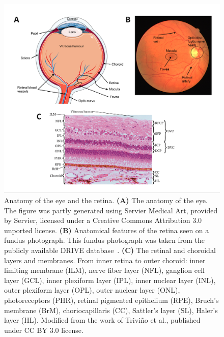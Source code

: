 \documentclass{article}
\begin{document}
\begin{figure}[t!]
  \centering
  \includegraphics[width=\textwidth]{Figure1}
  \caption{Anatomy of the eye and the retina. \textbf{(A)} The anatomy of the eye. The figure was partly generated using Servier Medical Art, provided by Servier, licensed under a Creative Commons Attribution 3.0 unported license. \textbf{(B)} Anatomical features of the retina seen on a fundus photograph. This fundus photograph was taken from the publicly available DRIVE database~\cite{Staal_2004}. \textbf{(C)} The retinal and choroidal layers and membranes. From inner retina to outer choroid: inner limiting membrane (ILM), nerve fiber layer (NFL), ganglion cell layer (GCL), inner plexiform layer (IPL), inner nuclear layer (INL), outer plexiform layer (OPL), outer nuclear layer (ONL), photoreceptors (PHR), retinal pigmented epithelium (RPE), Bruch's membrane (BrM), choriocapillaris (CC), Sattler's layer (SL), Haler's layer (HL). Modified from the work of Trivi\~no et al., published under CC BY 3.0 license.~\cite{Trivino_2012}}
  \label{fig:architecture-eye}
\end{figure}
\end{document}
